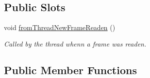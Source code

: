 \subsection*{Public Slots}
\begin{DoxyCompactItemize}
\item 
void \hyperlink{classmdt_usbtmc_port_manager_aca42b343ae1f6a324e6e45968f03bbea}{from\-Thread\-New\-Frame\-Readen} ()
\begin{DoxyCompactList}\small\item\em Called by the thread whenn a frame was readen. \end{DoxyCompactList}\end{DoxyCompactItemize}
\subsection*{Public Member Functions}
